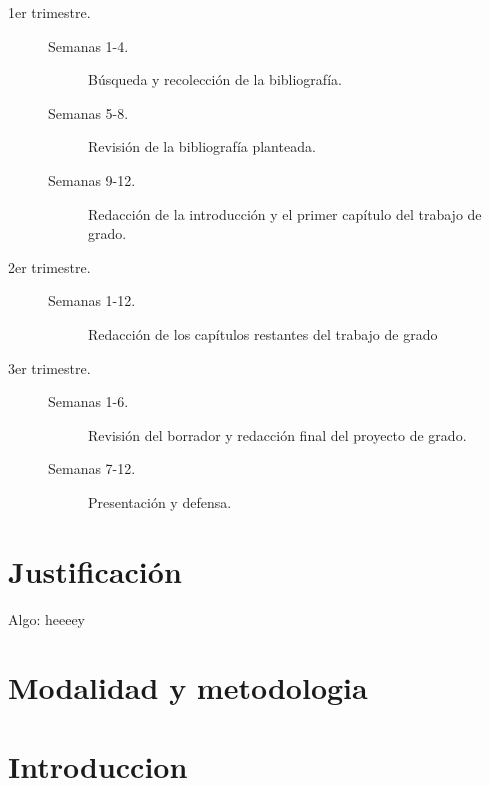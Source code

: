 \documentclass[12pt]{article}
\begin{document}
    \begin{description}
        \let\olditem\item
        \renewcommand\item[1][]{\olditem[\normalfont #1.]}
        \item[1er trimestre]
            \begin{minipage}[t]{\dimexpr\linewidth-2cm\relax}
                \begin{description}
                    \item[Semanas 1-4] Búsqueda y recolección de la bibliografía.
                    \item[Semanas 5-8] Revisión de la bibliografía planteada.
                    \item[Semanas 9-12] Redacción de la introducción y el primer capítulo
                                        del trabajo de grado.
                \end{description}
            \end{minipage}
        \item[2er trimestre]
            \begin{minipage}[t]{\linewidth}
                \begin{description}
                    \item[Semanas 1-12] Redacción de los capítulos restantes del trabajo de grado
                \end{description}
            \end{minipage}
        \item[3er trimestre]
            \begin{minipage}[t]{\linewidth}
                \begin{description}
                    \item[Semanas 1-6] Revisión del borrador y redacción final del
                                       proyecto de grado.
                    \item[Semanas 7-12] Presentación y defensa.
                \end{description}
            \end{minipage}
    \end{description}

    \section{Justificación}
    Algo: \cite{kanamori_higher_2009} heeeey
    \section{Modalidad y metodologia}
    \section{Introduccion}
    \singlespacing
    \printbibliography
\end{document}
